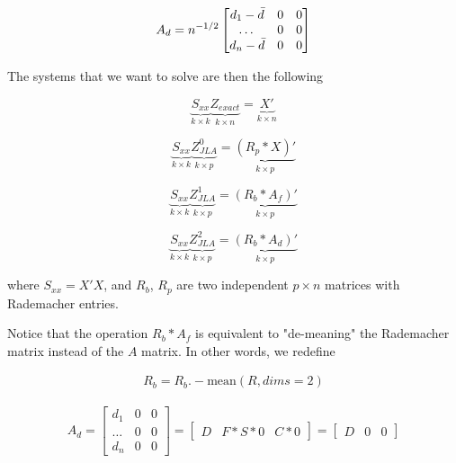 \documentclass[12pt]{article}
\begin{document}
\begin{equation}
    A_d = n^{-1/2} \begin{bmatrix}
d_1 - \Bar{d} & 0 & 0\\
\dots & 0 & 0\\
d_n - \Bar{d} & 0 & 0 
\end{bmatrix}
\end{equation}

The systems that we want to solve are then the following

\begin{equation}
    \underbrace{S_{xx}}_{k\times k} \underbrace{Z_{exact}}_{k\times n}  = \underbrace{ X'}_{k\times n}
\label{eq:exact}
\end{equation}

\begin{equation}
    \underbrace{S_{xx}}_{k\times k} \underbrace{Z_{JLA}^0}_{k\times p}  = \underbrace{(R_p *X)'}_{k\times p}
    \label{eq:JLA1}
\end{equation}

\begin{equation}
    \underbrace{S_{xx}}_{k\times k} \underbrace{Z_{JLA}^1}_{k\times p}  = \underbrace{(R_b *A_f)'}_{k\times p}
        \label{eq:JLA2}
\end{equation}

\begin{equation}
    \underbrace{S_{xx}}_{k\times k} \underbrace{Z_{JLA}^2}_{k\times p}  = \underbrace{(R_b *A_d)'}_{k\times p}
        \label{eq:JLA3}
\end{equation}

\noindent where $S_{xx} = X'X$, and $R_b$, $R_p$ are two independent $p\times n$ matrices with Rademacher entries. 


\noindent Notice that the operation $R_b *A_f$ is equivalent to "de-meaning" the Rademacher matrix instead of the $A$ matrix. In other words, we redefine

\begin{align}
    R_b =  R_b .- \text{mean}(R, dims=2)   
\end{align}

\begin{align}
    A_d =  \begin{bmatrix}
d_1  & 0 & 0\\
\dots & 0 & 0\\
d_n  & 0 & 0 
\end{bmatrix} =   \begin{bmatrix} D & F*S * 0 & C*0 \end{bmatrix} =  \begin{bmatrix} D & 0 & 0 \end{bmatrix}
\end{align}
\end{document}
